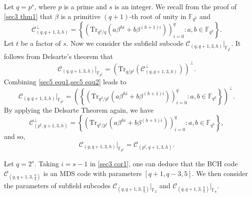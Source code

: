 \documentclass[sn-mathphys-num]{sn-jnl}%
\theoremstyle{thmstyleone}%
\theoremstyle{thmstyletwo}%
\theoremstyle{thmstylethree}%
\begin{document}
Let $q=p^s$, where $p$ is a prime and $s$ is an integer. We recall from the proof of \cref{sec3 thm1} that $\beta$ is a primitive $(q+1)$-th root of unity in $\mathbb{F}_{q^2}$ and 
\begin{equation}\label{sec5 equ1}
	\mathcal{C}_{(q,q+1,3,h)}^\perp=\left\{\left(\mathrm{Tr}_{q^{2}/q}\left(a\beta^{hi}+b\beta^{(h+1)i}\right)\right)_{i=0}^{q}:a,b\in\mathbb{F}_{q^2}\right\}.
\end{equation}
Let $t$ be a factor of $s$. Now we consider the subfield subcode $\mathcal{C}_{(q,q+1,3,h)}|_{\mathbb{F}_{p^t}}$. It follows from Delsarte’s theorem \cite[Theorem 2]{Delsarte1975SubfieldSubcodesModified} that
\begin{equation}\label{sec5 equ2}
	\mathcal{C}_{(q,q+1,3,h)}|_{\mathbb{F}_{p^t}}=\left(\mathrm{Tr}_{q/{p^t}}\left(\mathcal{C}_{(q,q+1,3,h)}^\perp\right)\right)^\perp.
\end{equation}
Combining \cref{sec5 equ1,sec5 equ2} leads to
\begin{equation*}
	\mathcal{C}_{(q,q+1,3,h)}|_{\mathbb{F}_{p^t}}=\left(\left\{\left(\mathrm{Tr}_{q^{2}/{p^t}}\left(a\beta^{hi}+b\beta^{(h+1)i}\right)\right)_{i=0}^{q}:a,b\in\mathbb{F}_{q^2}\right\}\right)^\perp.
\end{equation*}
By applying the Delsarte Theorem again, we have
\begin{equation*}
	\mathcal{C}_{(p^t,q+1,3,h)}^\perp=\left\{\left(\mathrm{Tr}_{q^{2}/{p^t}}\left(a\beta^{hi}+b\beta^{(h+1)i}\right)\right)_{i=0}^{q}:a,b\in\mathbb{F}_{q^2}\right\},
\end{equation*}
and so,
\begin{equation}\label{sec5 equ3}
	\mathcal{C}_{(q,q+1,3,h)}|_{\mathbb{F}_{p^t}}=\mathcal{C}_{(p^t,q+1,3,h)}.
\end{equation}


Let $q=2^s$. Taking $i=s-1$ in \cref{sec3 cor1}, one can deduce that the BCH code $\mathcal{C}_{(q,q+1,3,\frac{q}{4})}$ is an MDS code with parameters $[q+1,q-3,5]$. We then consider the parameters of subfield subcodes $\mathcal{C}_{(q,q+1,3,\frac{q}{4})}|_{\mathbb{F}_{2}}$ and  $\mathcal{C}_{(q,q+1,3,\frac{q}{4})}|_{\mathbb{F}_{4}}$. 
\end{document}
